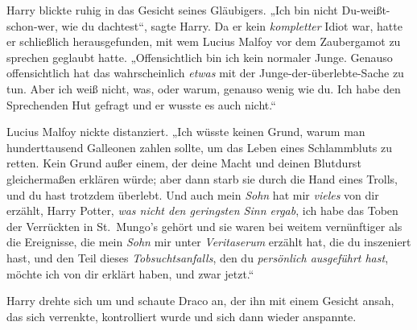 Harry blickte ruhig in das Gesicht seines Gläubigers.
„Ich bin nicht Du-weißt-schon-wer, wie du dachtest“, sagte Harry.
Da er kein \emph{kompletter} Idiot war, hatte er schließlich herausgefunden, mit wem Lucius Malfoy vor dem Zaubergamot zu sprechen geglaubt hatte.
„Offensichtlich bin ich kein normaler Junge. Genauso offensichtlich hat das wahrscheinlich \emph{etwas} mit der Junge-der-überlebte-Sache zu tun. Aber ich weiß nicht, was, oder warum, genauso wenig wie du. Ich habe den Sprechenden Hut gefragt und er wusste es auch nicht.“

Lucius Malfoy nickte distanziert.
„Ich wüsste keinen Grund, warum man hunderttausend Galleonen zahlen sollte, um das Leben eines Schlammbluts zu retten. Kein Grund außer einem, der deine Macht und deinen Blutdurst gleichermaßen erklären würde; aber dann starb sie durch die Hand eines Trolls, und du hast trotzdem überlebt. Und auch mein \emph{Sohn} hat mir \emph{vieles} von dir erzählt, Harry Potter, \emph{was nicht den geringsten Sinn ergab}, ich habe das Toben der Verrückten in St.~Mungo’s gehört und sie waren bei weitem vernünftiger als die Ereignisse, die mein \emph{Sohn} mir unter \emph{Veritaserum} erzählt hat, die du inszeniert hast, und den Teil dieses \emph{Tobsuchtsanfalls}, den du \emph{persönlich ausgeführt hast}, möchte ich von dir erklärt haben, und zwar jetzt.“

Harry drehte sich um und schaute Draco an, der ihn mit einem Gesicht ansah, das sich verrenkte, kontrolliert wurde und sich dann wieder anspannte.

